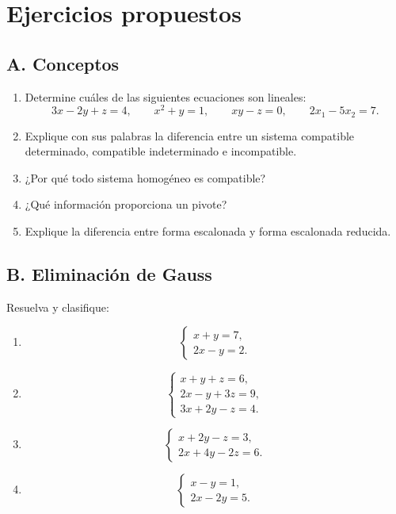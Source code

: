 \documentclass[12pt]{article}
\theoremstyle{remark}
\begin{document}
\section{Ejercicios propuestos}

\subsection*{A. Conceptos}
\begin{enumerate}
\item Determine cuáles de las siguientes ecuaciones son lineales:
\[
3x-2y+z=4,\qquad x^2+y=1,\qquad xy-z=0,\qquad 2x_1-5x_2=7.
\]
\item Explique con sus palabras la diferencia entre un sistema compatible determinado, compatible
indeterminado e incompatible.
\item ¿Por qué todo sistema homogéneo es compatible?
\item ¿Qué información proporciona un pivote?
\item Explique la diferencia entre forma escalonada y forma escalonada reducida.
\end{enumerate}

\subsection*{B. Eliminación de Gauss}
Resuelva y clasifique:
\begin{enumerate}
\item
\[
\begin{cases}
x+y=7,\\
2x-y=2.
\end{cases}
\]
\item
\[
\begin{cases}
x+y+z=6,\\
2x-y+3z=9,\\
3x+2y-z=4.
\end{cases}
\]
\item
\[
\begin{cases}
x+2y-z=3,\\
2x+4y-2z=6.
\end{cases}
\]
\item
\[
\begin{cases}
x-y=1,\\
2x-2y=5.
\end{cases}
\]
\end{enumerate}
\end{document}
